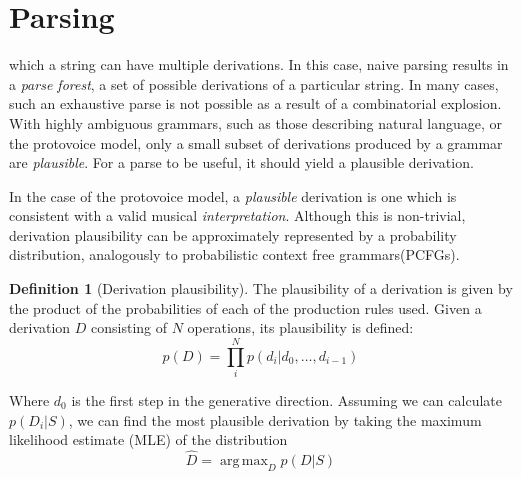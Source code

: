 \documentclass[12pt,a4paper,twoside,openright]{report} \usepackage[pdfborder={0 0 0}]{hyperref}    %
\DeclareMathOperator*{\argmax}{arg\,max} \DeclareMathOperator*{\argmin}{arg\,min}
\theoremstyle{definition} \newtheorem{definition}{Definition}[section]
\begin{document}
\section{Parsing} %
which a string can have multiple derivations. In this case, naive parsing results in a \textit{parse forest}, a set of
possible derivations of a particular string. In many cases, such an exhaustive parse is not possible as a result of
a combinatorial explosion. With highly ambiguous grammars, such as those describing natural language, or the protovoice
model, only a small subset of derivations produced by a grammar are \textit{plausible}. For a parse to be useful, it
should yield a plausible derivation.

In the case of the protovoice model, a \textit{plausible} derivation is one which is consistent with a valid musical
\textit{interpretation}. Although this is non-trivial, derivation plausibility can be approximately represented by
a probability distribution, analogously to probabilistic context free grammars(PCFGs). \par
\par \begin{definition}[Derivation plausibility] The plausibility of a derivation is given by the product of the
  probabilities of each of the production rules used. Given a derivation $D$ consisting of $N$ operations, its
  plausibility is defined: \begin{equation} p(D) = \prod_{i}^N p(d_i| d_0, \dots , d_{i-1}) \end{equation}
\end{definition}

Where $d_0$ is the first step in the generative direction. Assuming we can calculate $p(D_i|S)$, we can find the most
plausible derivation by taking the maximum likelihood estimate (MLE) of the distribution \begin{equation} \hat
D = \argmax_{D}  p(D|S) \label{eq:mapApproach} \end{equation}
\end{document}
